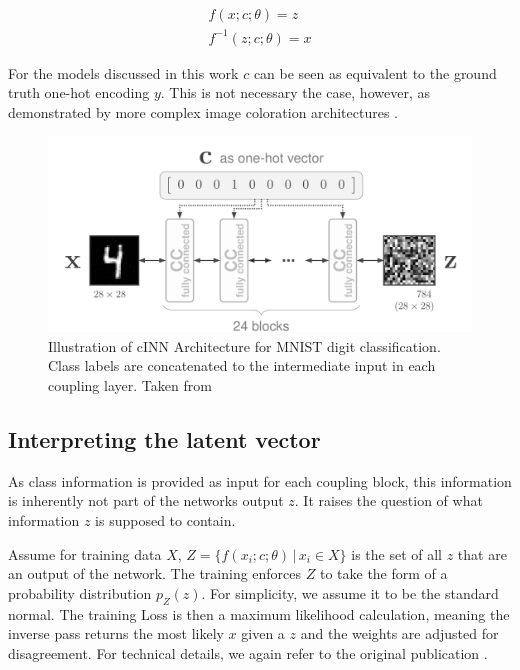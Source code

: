 \documentclass[final]{cvpr}
\begin{document}
\begin{equation} \label{eq:cINN}
\begin{split}
		f(x;c;\theta) 		= z \\
		f^{-1}(z;c;\theta) 	= x
\end{split}
\end{equation}

For the models discussed in this work $c$ can be seen as equivalent to the ground truth one-hot encoding $y$. This is not necessary the case, however, as demonstrated by more complex image coloration architectures \cite{main_paper_CINN}.

\begin{figure}[t]
	\begin{center}
		\includegraphics[width=0.8\linewidth]{./figs/cINN_MNIST_model.png}
	\end{center}
	\caption{Illustration of cINN Architecture for MNIST digit classification. Class labels are concatenated to the intermediate input in each coupling layer. Taken from \cite{main_paper_CINN}}
	\label{fig:cINN_concept}
\end{figure}

\subsection{Interpreting the latent vector}
As class information is provided as input for each coupling block, this information is inherently not part of the networks output $z$. It raises the question of what information $z$ is supposed to contain.

Assume for training data $X$, $Z = \{f(x_i;c;\theta) \,|\, x_i \in X\}$ is the set of all $z$ that are an output of the network. The training enforces $Z$ to take the form of a probability distribution $p_Z(z)$. For simplicity, we assume it to be the standard normal. The training Loss is then a maximum likelihood calculation, meaning the inverse pass returns the most likely $x$ given a $z$ and the weights are adjusted for disagreement.
For technical details, we again refer to the original publication \cite{main_paper_CINN}.
\end{document}
